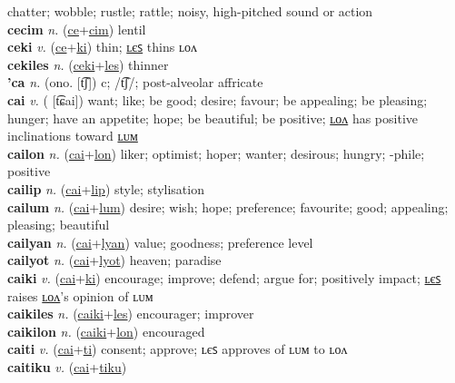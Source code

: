 chatter; wobble; rustle; rattle; noisy, high-pitched sound or action \label{cecelon} \\
\textbf{cecim} \textit{n.} (\hyperref[ce]{ce}+\hyperref[cim]{cim})
lentil \label{cecim} \\
\textbf{ceki} \textit{v.} (\hyperref[ce]{ce}+\hyperref[ki]{ki})
thin; \hyperref[cekiles]{ʟєꜱ} thins ʟᴏᴧ \label{ceki} \\
\textbf{cekiles} \textit{n.} (\hyperref[ceki]{ceki}+\hyperref[les]{les})
thinner \label{cekiles} \\
\textbf{'ca} \textit{n.} (ono. [t͡ʃ])
c; /t͡ʃ/; post-alveolar affricate \label{'ca} \\
\textbf{cai} \textit{v.} ( [t͡ɕai])
want; like; be good; desire; favour; be appealing; be pleasing; hunger; have an appetite; hope; be beautiful; be positive; \hyperref[cailon]{ʟᴏᴧ} has positive inclinations toward \hyperref[cailum]{ʟᴜᴍ} \label{cai} \\
\textbf{cailon} \textit{n.} (\hyperref[cai]{cai}+\hyperref[lon]{lon})
liker; optimist; hoper; wanter; desirous; hungry; -phile; positive \label{cailon} \\
\textbf{cailip} \textit{n.} (\hyperref[cai]{cai}+\hyperref[lip]{lip})
style; stylisation \label{cailip} \\
\textbf{cailum} \textit{n.} (\hyperref[cai]{cai}+\hyperref[lum]{lum})
desire; wish; hope; preference; favourite; good; appealing; pleasing; beautiful \label{cailum} \\
\textbf{cailyan} \textit{n.} (\hyperref[cai]{cai}+\hyperref[lyan]{lyan})
value; goodness; preference level \label{cailyan} \\
\textbf{cailyot} \textit{n.} (\hyperref[cai]{cai}+\hyperref[lyot]{lyot})
heaven; paradise \label{cailyot} \\
\textbf{caiki} \textit{v.} (\hyperref[cai]{cai}+\hyperref[ki]{ki})
encourage; improve; defend; argue for; positively impact; \hyperref[caikiles]{ʟєꜱ} raises \hyperref[caikilon]{ʟᴏᴧ}’s opinion of ʟᴜᴍ \label{caiki} \\
\textbf{caikiles} \textit{n.} (\hyperref[caiki]{caiki}+\hyperref[les]{les})
encourager; improver \label{caikiles} \\
\textbf{caikilon} \textit{n.} (\hyperref[caiki]{caiki}+\hyperref[lon]{lon})
encouraged \label{caikilon} \\
\textbf{caiti} \textit{v.} (\hyperref[cai]{cai}+\hyperref[ti]{ti})
consent; approve; ʟєꜱ approves of ʟᴜᴍ to ʟᴏᴧ \label{caiti} \\
\textbf{caitiku} \textit{v.} (\hyperref[cai]{cai}+\hyperref[tiku]{tiku})
